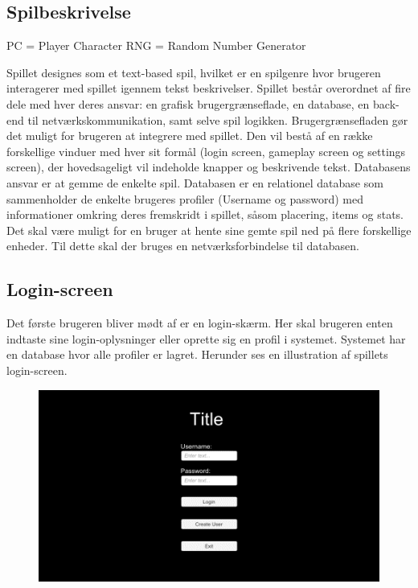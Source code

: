 \newpage

\subsection{Spilbeskrivelse}

PC = Player Character
RNG = Random Number Generator

Spillet designes som et text-based spil, hvilket er en spilgenre hvor brugeren interagerer med spillet igennem tekst beskrivelser. Spillet består overordnet af fire dele med hver deres ansvar: en grafisk brugergrænseflade, en database, en back-end til netværkskommunikation, samt selve spil logikken. Brugergrænsefladen gør det muligt for brugeren at integrere med spillet. Den vil bestå af en række forskellige vinduer med hver sit formål (login screen, gameplay screen og settings screen), der hovedsageligt vil indeholde knapper og beskrivende tekst. Databasens ansvar er at gemme de enkelte spil. Databasen er en relationel database som sammenholder de enkelte brugeres profiler (Username og password) med informationer omkring deres fremskridt i spillet, såsom placering, items og stats. Det skal være muligt for en bruger at hente sine gemte spil ned på flere forskellige enheder. Til dette skal der bruges en netværksforbindelse til databasen.   

\subsection{Login-screen}
Det første brugeren bliver mødt af er en login-skærm. Her skal brugeren enten indtaste sine login-oplysninger eller oprette sig en profil i systemet. Systemet har en database hvor alle profiler er lagret. Herunder ses en illustration af spillets login-screen. 

\begin{figure}[h]
\centering
\includegraphics[width = \textwidth]{02-Body/Images/Loginscreen-udkast.png}
\caption{}
\label{fig:Loginscreen-udkast}
\end{figure}

